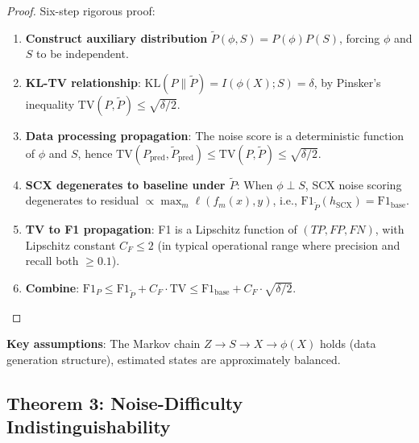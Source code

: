 \documentclass[12pt,a4paper]{article}
\theoremstyle{definition}
\theoremstyle{remark}
\begin{document}
\begin{proof}
Six-step rigorous proof:
\begin{enumerate}[label=\arabic*.]
\item \textbf{Construct auxiliary distribution} $\tilde{P}(\phi, S) = P(\phi)P(S)$, forcing $\phi$ and $S$ to be independent.
\item \textbf{KL-TV relationship}: $\mathrm{KL}(P \parallel \tilde{P}) = I(\phi(X); S) = \delta$, by Pinsker's inequality $\mathrm{TV}(P, \tilde{P}) \leq \sqrt{\delta/2}$.
\item \textbf{Data processing propagation}: The noise score is a deterministic function of $\phi$ and $S$, hence $\mathrm{TV}(P_{\text{pred}}, \tilde{P}_{\text{pred}}) \leq \mathrm{TV}(P, \tilde{P}) \leq \sqrt{\delta/2}$.
\item \textbf{SCX degenerates to baseline under $\tilde{P}$}: When $\phi \perp S$, SCX noise scoring degenerates to residual $\propto \max_m \ell(f_m(x), y)$, i.e., $\mathrm{F1}_{\tilde{P}}(h_{\text{SCX}}) = \mathrm{F1}_{\text{base}}$.
\item \textbf{TV to F1 propagation}: F1 is a Lipschitz function of $(TP, FP, FN)$, with Lipschitz constant $C_F \leq 2$ (in typical operational range where precision and recall both $\geq 0.1$).
\item \textbf{Combine}: $\mathrm{F1}_P \leq \mathrm{F1}_{\tilde{P}} + C_F \cdot \mathrm{TV} \leq \mathrm{F1}_{\text{base}} + C_F \cdot \sqrt{\delta/2}$.
\end{enumerate}
\end{proof}

\noindent\textbf{Key assumptions}: The Markov chain $Z \to S \to X \to \phi(X)$ holds (data generation structure), estimated states are approximately balanced.

\subsection{Theorem 3: Noise-Difficulty Indistinguishability}
\end{document}
